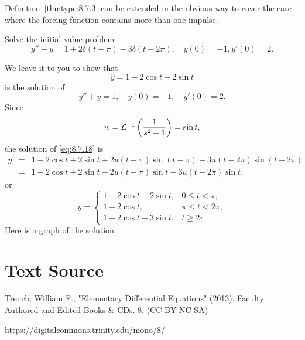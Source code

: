 \documentclass{ximera}
\begin{document}
Definition~\ref{thmtype:8.7.3} can be extended in the obvious way to cover
the case where the forcing function contains more than one impulse.
\begin{example}\label{example:8.7.3}
Solve the  initial value problem
\begin{equation} \label{eq:8.7.18}
y''+y=1+2\delta(t-\pi)-3\delta(t-2\pi), \quad    y(0)=-1,   y'(0)=2.
\end{equation}
\begin{explanation}
We leave it to you to show that
$$
\hat y= 1-2\cos t+2\sin t
$$
is the solution of
$$
y''+y=1, \quad    y(0)=-1,\quad    y'(0)=2.
$$
Since
$$
w={\cal L}^{-1}\left(\frac{1}{s^2+1}\right)=\sin t,
$$
the solution of  \eqref{eq:8.7.18} is
\begin{eqnarray*}
y&=&1-2\cos t+2\sin t+2u(t-\pi)\sin(t-\pi)-3u(t-2\pi)\sin(t-2\pi)\\
&=&1-2\cos t+2\sin t-2u(t-\pi)\sin t-3u(t-2\pi)\sin t,
\end{eqnarray*}
or
\begin{equation} \label{eq:8.7.19}
y=\left\{\begin{array}{cl} 1-2\cos t+2\sin t,&0\leq t<\pi,\\
1-2\cos t,&\pi\leq t<2\pi,\\
1-2\cos t-3\sin t,&t\geq 2\pi\end{array}\right.
\end{equation}
Here is a graph of the solution.

\begin{center}
\end{center}

\end{explanation}
\end{example}


\section*{Text Source}
Trench, William F., "Elementary Differential Equations" (2013). Faculty Authored and Edited Books \& CDs. 8. (CC-BY-NC-SA)

\href{https://digitalcommons.trinity.edu/mono/8/}{https://digitalcommons.trinity.edu/mono/8/}
\end{document}
